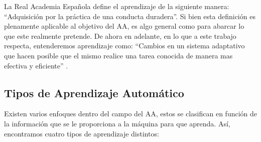 La Real Academia Española define el aprendizaje de la siguiente manera: ``Adquisición por la práctica de una conducta duradera''. Si bien esta definición es plenamente aplicable al objetivo del \acf{AA}, es algo general como para abarcar lo que este realmente pretende. De ahora en adelante, en lo que a este trabajo respecta, entenderemos aprendizaje como: ``Cambios en un sistema adaptativo que hacen posible que el mismo realice una tarea conocida de manera mas efectiva y eficiente'' \cite{Michalski:2013}.

\subsection{Tipos de Aprendizaje Automático}

Existen varios enfoques dentro del campo del \acf{AA}, estos se clasifican en función de la información que se le proporciona a la máquina para que aprenda. Así, encontramos cuatro tipos de aprendizaje distintos: 

